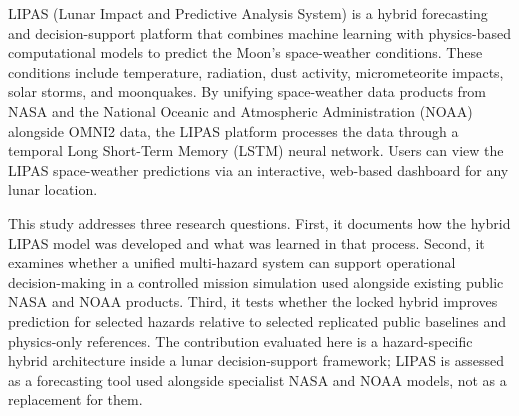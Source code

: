LIPAS (Lunar Impact and Predictive Analysis System) is a hybrid forecasting and decision-support platform that combines machine learning with physics-based computational models to predict the Moon's space-weather conditions. These conditions include temperature, radiation, dust activity, micrometeorite impacts, solar storms, and moonquakes. By unifying space-weather data products from NASA and the National Oceanic and Atmospheric Administration (NOAA) alongside OMNI2 data, the LIPAS platform processes the data through a temporal Long Short-Term Memory (LSTM) neural network. Users can view the LIPAS space-weather predictions via an interactive, web-based dashboard for any lunar location.

This study addresses three research questions. First, it documents how the hybrid LIPAS model was developed and what was learned in that process. Second, it examines whether a unified multi-hazard system can support operational decision-making in a controlled mission simulation used alongside existing public NASA and NOAA products. Third, it tests whether the locked hybrid improves prediction for selected hazards relative to selected replicated public baselines and physics-only references. The contribution evaluated here is a hazard-specific hybrid architecture inside a lunar decision-support framework; LIPAS is assessed as a forecasting tool used alongside specialist NASA and NOAA models, not as a replacement for them.
